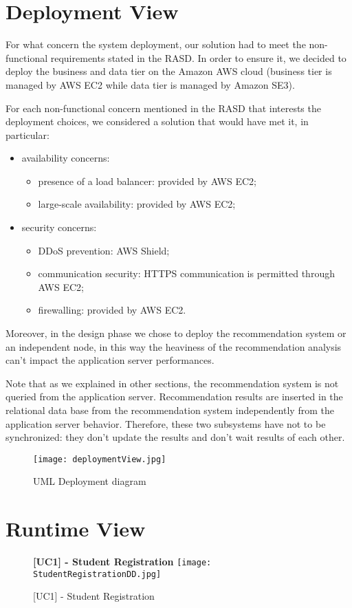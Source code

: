 	\section{Deployment View}
		For what concern the system deployment, our solution had to meet the non-functional requirements stated in the RASD. In order to ensure it, we decided to deploy the business and data tier on the Amazon AWS cloud (business tier is managed by AWS EC2 while data tier is managed by Amazon SE3).
		
		For each non-functional concern mentioned in the RASD that interests the deployment choices, we considered a solution that would have met it, in particular:
		\begin{itemize}
			\item availability concerns:
				\begin{itemize}
					\item presence of a load balancer: provided by AWS EC2;
					\item large-scale availability: provided by AWS EC2;
				\end{itemize}
			\item security concerns:
				\begin{itemize}
					\item DDoS prevention: AWS Shield;
					\item communication security: HTTPS communication is permitted through AWS EC2;
					\item firewalling: provided by AWS EC2.
				\end{itemize}
		\end{itemize}
		Moreover, in the design phase we chose to deploy the recommendation system or an independent node, in this way the heaviness of the recommendation analysis can't impact the application server performances.
		
		Note that as we explained in other sections, the recommendation system is not queried from the application server. Recommendation results are inserted in the relational data base from the recommendation system independently from the application server behavior. Therefore, these two subsystems have not to be synchronized: they don't update the results and don't wait results of each other.
		
		\begin{figure}[H]
			\centering
			\caption{UML Deployment diagram}
			\texttt{[image: deploymentView.jpg]}
		\end{figure}
	\section{Runtime View}
		\begin{figure}[H]
			\centering
			{\bfseries [UC1] - Student Registration}
			\texttt{[image: StudentRegistrationDD.jpg]}
			\caption{[UC1] - Student Registration}
		\end{figure}
			
